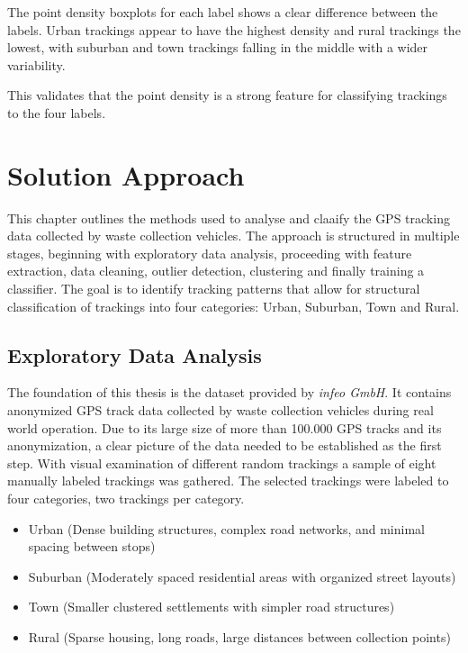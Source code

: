\documentclass[a4paper,12pt,twoside]{scrreprt}
\begin{document}
The point density boxplots for each label shows a clear difference between the
labels. Urban trackings appear to have the highest density and rural trackings
the lowest, with suburban and town trackings falling in the middle with a wider
variability.

This validates that the point density is a strong feature for classifying
trackings to the four labels.

\section{Solution Approach}
This chapter outlines the methods used to analyse and claaify the GPS tracking
data collected by waste collection vehicles.
The approach is structured in multiple stages, beginning with exploratory data
analysis, proceeding with feature extraction, data cleaning, outlier detection,
clustering and finally training a classifier.
The goal is to identify tracking patterns that allow for structural
classification of trackings into four categories: Urban, Suburban, Town and
Rural.

\subsection{Exploratory Data Analysis}

The foundation of this thesis is the dataset provided by \textit{infeo GmbH}.
It contains anonymized GPS track data collected by waste collection vehicles
during real world operation. Due to its large size of more than 100.000 GPS
tracks and its anonymization, a clear picture of the data needed to be
established as the first step.
With visual examination of different random trackings a sample of eight
manually labeled trackings was gathered.
The selected trackings were labeled to four categories, two trackings per
category.

\begin{itemize}
  \item Urban (Dense building structures, complex road networks, and minimal
        spacing between stops)
  \item Suburban (Moderately spaced residential areas with organized street
        layouts)
  \item Town (Smaller clustered settlements with simpler road structures)
  \item Rural (Sparse housing, long roads, large distances between collection
        points)
\end{itemize}
\end{document}
